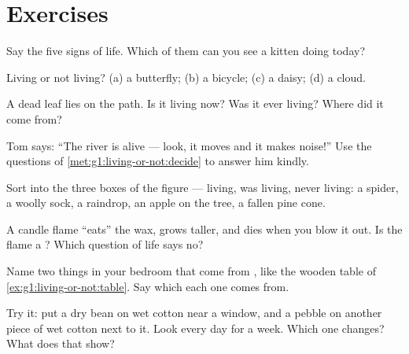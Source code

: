\section{Exercises}

\begin{exercise}[$\star$]\label{exo:g1:living-or-not:1}
Say the five signs of life. Which of them can you see a kitten doing
today?
\end{exercise}

\begin{exercise}[$\star$]\label{exo:g1:living-or-not:2}
Living or not living? (a) a butterfly; (b) a bicycle; (c) a daisy;
(d) a cloud.
\end{exercise}

\begin{exercise}[$\star$]\label{exo:g1:living-or-not:3}
A dead leaf lies on the path. Is it living now? Was it ever living?
Where did it come from?
\end{exercise}

\begin{exercise}[$\star$]\label{exo:g1:living-or-not:4}
Tom says: ``The river is alive --- look, it moves and it makes
noise!'' Use the questions of \cref{met:g1:living-or-not:decide} to
answer him kindly.
\end{exercise}

\begin{exercise}[$\star$]\label{exo:g1:living-or-not:5}
Sort into the three boxes of the figure --- living, was living,
never living: a spider, a woolly sock, a raindrop, an apple on the
tree, a fallen pine cone.
\end{exercise}

\begin{exercise}[$\star$]\label{exo:g1:living-or-not:6}
A candle flame ``eats'' the wax, grows taller, and dies when you
blow it out. Is the flame a ? Which question of life
says no?
\end{exercise}

\begin{exercise}[$\star$]\label{exo:g1:living-or-not:7}
Name two things in your bedroom that come from , like
the wooden table of \cref{ex:g1:living-or-not:table}. Say which
 each one comes from.
\end{exercise}

\begin{exercise}[$\star$]\label{exo:g1:living-or-not:8}
Try it: put a dry bean on wet cotton near a window, and a pebble on
another piece of wet cotton next to it. Look every day for a week.
Which one changes? What does that show?
\end{exercise}

